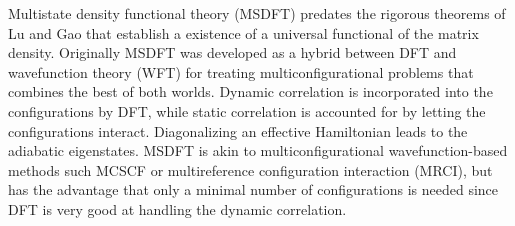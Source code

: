 \documentclass[journal=jpclcd,manuscript=letter]{achemso}
\begin{document}
Multistate density functional theory (MSDFT)
\cite{Gao2016} predates the rigorous theorems of Lu and Gao \cite{Lu2022JPCL}
that establish a existence of a universal functional of the matrix density.
Originally MSDFT was developed as a hybrid between DFT and wavefunction theory (WFT) for treating multiconfigurational problems
that combines the best of both worlds. Dynamic correlation is incorporated
into the configurations by DFT, while static correlation is accounted for by letting the configurations interact.
Diagonalizing an effective Hamiltonian leads to the adiabatic eigenstates. MSDFT is akin to multiconfigurational wavefunction-based methods such
MCSCF or multireference configuration interaction (MRCI),
but has the advantage that only a minimal number of configurations is needed \cite{Lu2022fundamental} since DFT
is very good at handling the dynamic correlation. \cite{Leininger1997combining}
\end{document}
